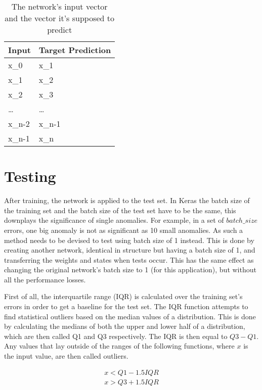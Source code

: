 \begin{table}[H]
	\centering
	\caption{The network's input vector and the vector it's supposed to predict}\label{tab:training_set_shift}
	\begin{tabular}{ll}
		Input & Target Prediction \\ \hline
		x_0    & x_1                \\
		x_1    & x_2                \\
		x_2    & x_3                \\
		\dots   & \dots               \\
		x_{n-2}  & x_{n-1}              \\
		x_{n-1}  & x_n               
	\end{tabular}
\end{table}

\section{Testing}\label{sec:methods:testing}
After training, the network is applied to the test set. In Keras the batch size of the training set and the batch size of the test set have to be the same, this downplays the significance of single anomalies. For example, in a set of \(batch\_size\) errors, one big anomaly is not as significant as 10 small anomalies. As such a method needs to be devised to test using batch size of 1 instead. This is done by creating another network, identical in structure but having a batch size of 1, and transferring the weights and states when tests occur. This has the same effect as changing the original network's batch size to 1 (for this application), but without all the performance losses.

First of all, the interquartile range (IQR) is calculated over the training set's errors in order to get a baseline for the test set. The IQR function attempts to find statistical outliers based on the median values of a distribution. This is done by calculating the medians of both the upper and lower half of a distribution, which are then called Q1 and Q3 respectively. The IQR is then equal to \(Q3 - Q1\). Any values that lay outside of the ranges of the following functions, where \(x\) is the input value, are then called outliers.

\begin{subequations}
\begin{align}
	x < Q1 - 1.5 IQR \label{eq:iqr_min} \\
	x > Q3 + 1.5 IQR \label{eq:iqr_max}
\end{align}
\end{subequations}

